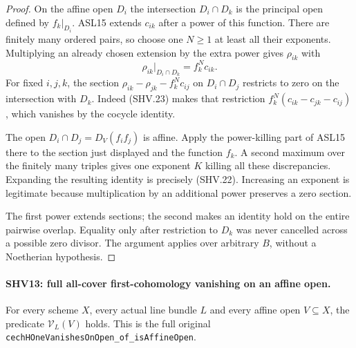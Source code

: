 \begin{proof}
On the affine open $D_i$ the intersection $D_i\cap D_k$
is the principal open defined by $f_k|_{D_i}$.
ASL15 extends $c_{ik}$ after a power of this function.
There are finitely many ordered pairs, so choose one $N\ge1$
at least all their exponents.  Multiplying an already chosen
extension by the extra power gives $\rho_{ik}$ with
\[
                  \rho_{ik}|_{D_i\cap D_k}=f_k^N c_{ik}.
                                                        \tag{SHV.23}
\]
For fixed $i,j,k$, the section
$\rho_{ik}-\rho_{jk}-f_k^N c_{ij}$ on $D_i\cap D_j$
restricts to zero on the intersection with $D_k$.
Indeed (SHV.23) makes that restriction
$f_k^N(c_{ik}-c_{jk}-c_{ij})$, which vanishes by the cocycle
identity.

The open $D_i\cap D_j=D_V(f_i f_j)$ is affine.  Apply the
power-killing part of ASL15 there to the section just displayed
and the function $f_k$.  A second maximum over the finitely many
triples gives one exponent $K$ killing all these discrepancies.
Expanding the resulting identity is precisely (SHV.22).
Increasing an exponent is legitimate because multiplication by
an additional power preserves a zero section.

The first power extends sections; the second makes an identity
hold on the entire pairwise overlap.  Equality only after
restriction to $D_k$ was never cancelled across a possible
zero divisor.  The argument applies over arbitrary $B$, without
a Noetherian hypothesis.
\end{proof}

\paragraph{SHV13: full all-cover first-cohomology vanishing on an affine open.}
\label{claim:SHV13}
For every scheme $X$, every actual line bundle $L$ and every
affine open $V\subseteq X$, the predicate $\mathcal V_L(V)$
holds.  This is the full original
\texttt{cechHOneVanishesOnOpen\_\allowbreak of\_\allowbreak isAffineOpen}.

